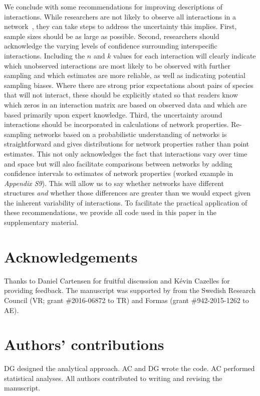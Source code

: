 \documentclass[12pt]{article}
\begin{document}
\begin{spacing}{2.0}
  We conclude with some recommendations for improving descriptions of interactions. While researchers are not likely to observe all interactions in a network~\citep{Jordano2016}, they can take steps to address the uncertainty this implies. First, sample sizes should be as large as possible. Second, researchers should acknowledge the varying levels of confidence surrounding interspecific interactions. Including the $n$ and $k$ values for each interaction will clearly indicate which unobserved interactions are most likely to be observed with further sampling and which estimates are more reliable, as well as indicating potential sampling biases. Where there are strong prior expectations about pairs of species that will not interact, these should be explicitly stated so that readers know which zeros in an interaction matrix are based on observed data and which are based primarily upon expert knowledge. Third, the uncertainty around interactions should be incorporated in calculations of network properties. Re-sampling networks based on a probabilistic understanding of networks is straightforward and gives distributions for network properties rather than point estimates. This not only acknowledges the fact that interactions vary over time and space but will also facilitate comparisons between networks by adding confidence intervals to estimates of network properties (worked example in \emph{Appendix S9}). This will allow us to say whether networks have different structures \emph{and} whether those differences are greater than we would expect given the inherent variability of interactions. To facilitate the practical application of these recommendations, we provide all code used in this paper in the supplementary material. 


\section*{Acknowledgements}

  Thanks to Daniel Cartensen for fruitful discussion and K\'{e}vin Cazelles for providing feedback. The manuscript was supported by from the Swedish Research Council (VR; grant \#2016-06872 to TR) and Formas (grant \#942-2015-1262 to AE).


\section*{Authors' contributions}

DG designed the analytical approach. AC and DG wrote the code. AC performed statistical analyses. All authors contributed to writing and revising the manuscript.



\end{spacing}
\end{document}
